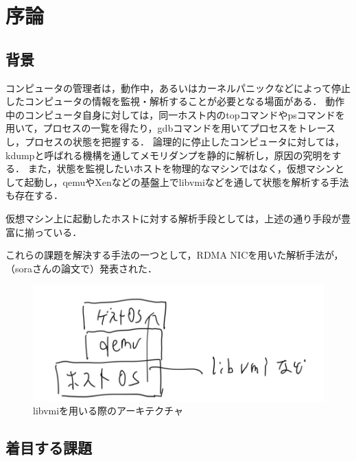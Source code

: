 \chapter{序論}
\label{chap:introduction}

\section{背景}
\label{section:background}

コンピュータの管理者は，動作中，あるいはカーネルパニックなどによって停止したコンピュータの情報を監視・解析することが必要となる場面がある．
動作中のコンピュータ自身に対しては，同一ホスト内のtopコマンドやpsコマンドを用いて，プロセスの一覧を得たり，gdbコマンドを用いてプロセスをトレースし，プロセスの状態を把握する．
論理的に停止したコンピュータに対しては，kdumpと呼ばれる機構を通してメモリダンプを静的に解析し，原因の究明をする．
また，状態を監視したいホストを物理的なマシンではなく，仮想マシンとして起動し，qemuやXenなどの基盤上でlibvmiなどを通して状態を解析する手法も存在する．

仮想マシン上に起動したホストに対する解析手段としては，上述の通り手段が豊富に揃っている．

これらの課題を解決する手法の一つとして，RDMA NICを用いた解析手法が，（soraさんの論文で）発表された．

\begin{figure}[htbp]
    \caption{libvmiを用いる際のアーキテクチャ}
    \label{fig:zentai}
    \begin{center}
        \includegraphics[bb=0 0 1000 340,width=15cm]{img/tegaki/01_vm.png}
    \end{center}
\end{figure}

\section{着目する課題}


